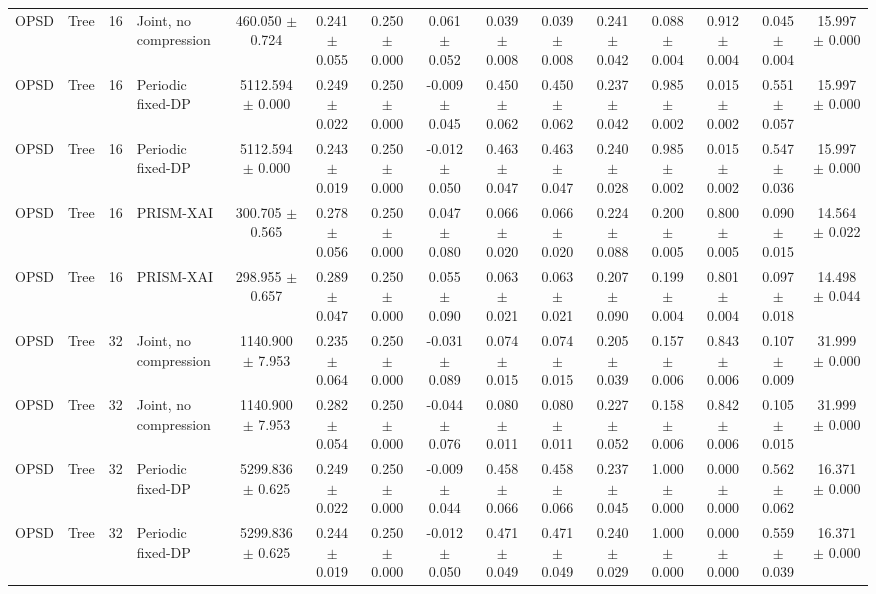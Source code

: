 \begin{table}[t]
\begin{tabular}{llllccccccccccc}
OPSD & Tree & 16 & Joint, no compression & 460.050 $\pm$ 0.724 & 0.241 $\pm$ 0.055 & 0.250 $\pm$ 0.000 & 0.061 $\pm$ 0.052 & 0.039 $\pm$ 0.008 & 0.039 $\pm$ 0.008 & 0.241 $\pm$ 0.042 & 0.088 $\pm$ 0.004 & 0.912 $\pm$ 0.004 & 0.045 $\pm$ 0.004 & 15.997 $\pm$ 0.000 \\
OPSD & Tree & 16 & Periodic fixed-DP & 5112.594 $\pm$ 0.000 & 0.249 $\pm$ 0.022 & 0.250 $\pm$ 0.000 & -0.009 $\pm$ 0.045 & 0.450 $\pm$ 0.062 & 0.450 $\pm$ 0.062 & 0.237 $\pm$ 0.042 & 0.985 $\pm$ 0.002 & 0.015 $\pm$ 0.002 & 0.551 $\pm$ 0.057 & 15.997 $\pm$ 0.000 \\
OPSD & Tree & 16 & Periodic fixed-DP & 5112.594 $\pm$ 0.000 & 0.243 $\pm$ 0.019 & 0.250 $\pm$ 0.000 & -0.012 $\pm$ 0.050 & 0.463 $\pm$ 0.047 & 0.463 $\pm$ 0.047 & 0.240 $\pm$ 0.028 & 0.985 $\pm$ 0.002 & 0.015 $\pm$ 0.002 & 0.547 $\pm$ 0.036 & 15.997 $\pm$ 0.000 \\
OPSD & Tree & 16 & PRISM-XAI & 300.705 $\pm$ 0.565 & 0.278 $\pm$ 0.056 & 0.250 $\pm$ 0.000 & 0.047 $\pm$ 0.080 & 0.066 $\pm$ 0.020 & 0.066 $\pm$ 0.020 & 0.224 $\pm$ 0.088 & 0.200 $\pm$ 0.005 & 0.800 $\pm$ 0.005 & 0.090 $\pm$ 0.015 & 14.564 $\pm$ 0.022 \\
OPSD & Tree & 16 & PRISM-XAI & 298.955 $\pm$ 0.657 & 0.289 $\pm$ 0.047 & 0.250 $\pm$ 0.000 & 0.055 $\pm$ 0.090 & 0.063 $\pm$ 0.021 & 0.063 $\pm$ 0.021 & 0.207 $\pm$ 0.090 & 0.199 $\pm$ 0.004 & 0.801 $\pm$ 0.004 & 0.097 $\pm$ 0.018 & 14.498 $\pm$ 0.044 \\
OPSD & Tree & 32 & Joint, no compression & 1140.900 $\pm$ 7.953 & 0.235 $\pm$ 0.064 & 0.250 $\pm$ 0.000 & -0.031 $\pm$ 0.089 & 0.074 $\pm$ 0.015 & 0.074 $\pm$ 0.015 & 0.205 $\pm$ 0.039 & 0.157 $\pm$ 0.006 & 0.843 $\pm$ 0.006 & 0.107 $\pm$ 0.009 & 31.999 $\pm$ 0.000 \\
OPSD & Tree & 32 & Joint, no compression & 1140.900 $\pm$ 7.953 & 0.282 $\pm$ 0.054 & 0.250 $\pm$ 0.000 & -0.044 $\pm$ 0.076 & 0.080 $\pm$ 0.011 & 0.080 $\pm$ 0.011 & 0.227 $\pm$ 0.052 & 0.158 $\pm$ 0.006 & 0.842 $\pm$ 0.006 & 0.105 $\pm$ 0.015 & 31.999 $\pm$ 0.000 \\
OPSD & Tree & 32 & Periodic fixed-DP & 5299.836 $\pm$ 0.625 & 0.249 $\pm$ 0.022 & 0.250 $\pm$ 0.000 & -0.009 $\pm$ 0.044 & 0.458 $\pm$ 0.066 & 0.458 $\pm$ 0.066 & 0.237 $\pm$ 0.045 & 1.000 $\pm$ 0.000 & 0.000 $\pm$ 0.000 & 0.562 $\pm$ 0.062 & 16.371 $\pm$ 0.000 \\
OPSD & Tree & 32 & Periodic fixed-DP & 5299.836 $\pm$ 0.625 & 0.244 $\pm$ 0.019 & 0.250 $\pm$ 0.000 & -0.012 $\pm$ 0.050 & 0.471 $\pm$ 0.049 & 0.471 $\pm$ 0.049 & 0.240 $\pm$ 0.029 & 1.000 $\pm$ 0.000 & 0.000 $\pm$ 0.000 & 0.559 $\pm$ 0.039 & 16.371 $\pm$ 0.000 \\

\end{tabular}
\end{table}
